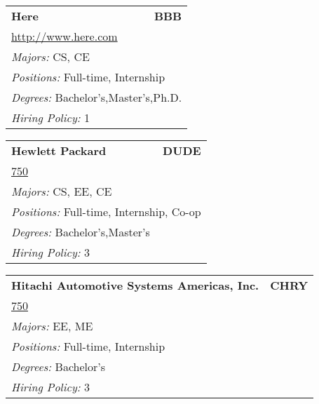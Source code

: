 \documentclass[twoside]{article}
\begin{document}
\begin{center}
\begin{multicols}{3}
\begin{FlushLeft}
\begin{minipage}{.9\columnwidth}
\end{minipage}
 
\begin{minipage}{.9\columnwidth}\begin{tabularx}{.95\columnwidth}{Xr}
                 {\Large\bf Here} & {\Large\bf BBB}\\
    \multicolumn{2}{p{.95\columnwidth}}{\url{http://www.here.com}}\\
    \multicolumn{2}{p{.95\columnwidth}}{\emph{Majors:} CS, CE}\\
    \multicolumn{2}{p{.95\columnwidth}}{\emph{Positions:} Full-time, Internship}\\
    \multicolumn{2}{p{.95\columnwidth}}{\emph{Degrees:} Bachelor's,Master's,Ph.D.}\\
    \multicolumn{2}{p{.95\columnwidth}}{\emph{Hiring Policy:} 1}\\
    \end{tabularx}
    
\end{minipage}
 
\begin{minipage}{.9\columnwidth}\begin{tabularx}{.95\columnwidth}{Xr}
                 {\Large\bf Hewlett Packard} & {\Large\bf DUDE}\\
    \multicolumn{2}{p{.95\columnwidth}}{\url{750}}\\
    \multicolumn{2}{p{.95\columnwidth}}{\emph{Majors:} CS, EE, CE}\\
    \multicolumn{2}{p{.95\columnwidth}}{\emph{Positions:} Full-time, Internship, Co-op}\\
    \multicolumn{2}{p{.95\columnwidth}}{\emph{Degrees:} Bachelor's,Master's}\\
    \multicolumn{2}{p{.95\columnwidth}}{\emph{Hiring Policy:} 3}\\
    \end{tabularx}
    
\end{minipage}
 
\begin{minipage}{.9\columnwidth}\begin{tabularx}{.95\columnwidth}{Xr}
                 {\Large\bf Hitachi Automotive Systems Americas, Inc.} & {\Large\bf CHRY}\\
    \multicolumn{2}{p{.95\columnwidth}}{\url{750}}\\
    \multicolumn{2}{p{.95\columnwidth}}{\emph{Majors:} EE, ME}\\
    \multicolumn{2}{p{.95\columnwidth}}{\emph{Positions:} Full-time, Internship}\\
    \multicolumn{2}{p{.95\columnwidth}}{\emph{Degrees:} Bachelor's}\\
    \multicolumn{2}{p{.95\columnwidth}}{\emph{Hiring Policy:} 3}\\
    \end{tabularx}
    

\end{minipage}
\end{FlushLeft}
\end{multicols}
\end{center}
\end{document}
